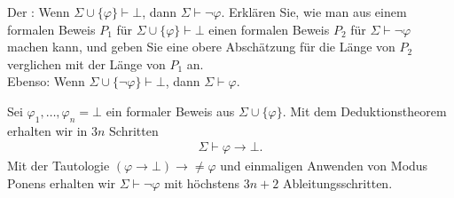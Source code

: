 
\begin{exercise}[98]

Der : Wenn $\Sigma \cup \{\varphi\} \vdash \bot$, dann
$\Sigma \vdash \neg \varphi$. Erklären Sie, wie man aus einem formalen Beweis
$P_1$ für $\Sigma \cup \{\varphi\} \vdash \bot$ einen formalen Beweis $P_2$
für $\Sigma \vdash \neg \varphi$ machen kann, und geben Sie eine obere
Abschätzung für die Länge von $P_2$ verglichen mit der Länge von $P_1$ an. \\
Ebenso: Wenn $\Sigma \cup \{\neg \varphi\} \vdash \bot$, dann $\Sigma \vdash \varphi$.

\end{exercise}


\begin{solution}

Sei $\varphi_1,\dots,\varphi_n = \bot$ ein formaler Beweis aus $\Sigma \cup \{\varphi\}$.
Mit dem Deduktionstheorem erhalten wir in $3n$ Schritten
\begin{align*}
  \Sigma \vdash \varphi \rightarrow \bot.
\end{align*}
Mit der Tautologie $(\varphi \rightarrow \bot) \rightarrow \neq \varphi$
und einmaligen Anwenden von Modus Ponens erhalten wir $\Sigma \vdash \neg \varphi$
mit höchstens $3n + 2$ Ableitungsschritten.

\end{solution}

